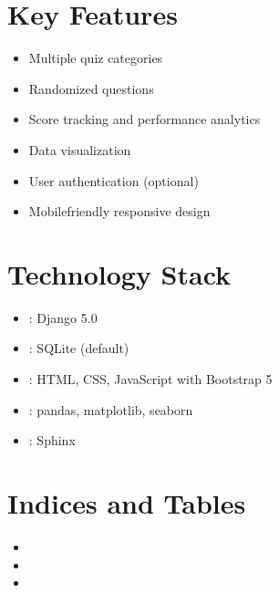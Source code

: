 \documentclass[letterpaper,10pt,english]{sphinxmanual}
\begin{document}
\chapter{Key Features}
\label{\detokenize{index:key-features}}\begin{itemize}
\item {} 
\sphinxAtStartPar
Multiple quiz categories

\item {} 
\sphinxAtStartPar
Randomized questions

\item {} 
\sphinxAtStartPar
Score tracking and performance analytics

\item {} 
\sphinxAtStartPar
Data visualization

\item {} 
\sphinxAtStartPar
User authentication (optional)

\item {} 
\sphinxAtStartPar
Mobile\sphinxhyphen{}friendly responsive design

\end{itemize}


\chapter{Technology Stack}
\label{\detokenize{index:technology-stack}}\begin{itemize}
\item {} 
\sphinxAtStartPar
{}: Django 5.0

\item {} 
\sphinxAtStartPar
{}: SQLite (default)

\item {} 
\sphinxAtStartPar
{}: HTML, CSS, JavaScript with Bootstrap 5

\item {} 
\sphinxAtStartPar
{}: pandas, matplotlib, seaborn

\item {} 
\sphinxAtStartPar
{}: Sphinx

\end{itemize}


\chapter{Indices and Tables}
\label{\detokenize{index:indices-and-tables}}\begin{itemize}
\item {} 
\sphinxAtStartPar
{}

\item {} 
\sphinxAtStartPar
{}

\item {} 
\sphinxAtStartPar
{}

\end{itemize}



\renewcommand{\indexname}{Index}
\printindex
\end{document}
